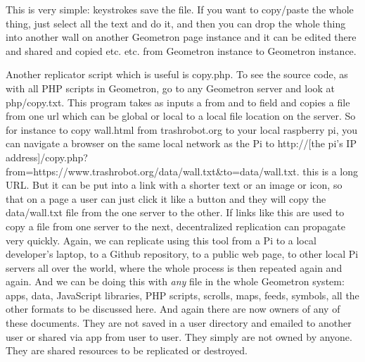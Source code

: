 This is very simple: keystrokes save the file. If you want to copy/paste the whole thing, just select all the text and do it, and then you can drop the whole thing into another wall on another Geometron page instance and it can be edited there and shared and copied etc. etc. from Geometron instance to Geometron instance.  

Another replicator script which is useful is copy.php.  To see the source code, as with all PHP scripts in Geometron, go to any Geometron server and look at php/copy.txt.  This program takes as inputs a from and to field and copies a file from one url which can be global or local to a local file location on the server.  So for instance to copy wall.html from trashrobot.org to your local raspberry pi, you can navigate a browser on the same local network as the Pi to http://[the pi's IP address]/copy.php?from=https://www.trashrobot.org/data/wall.txt&to=data/wall.txt.  this is a long URL.  But it can be put into a link with a shorter text or an image or icon, so that on a page a user can just click it like a button and they will copy the data/wall.txt file from the one server to the other.  If links like this are used to copy a file from one server to the next, decentralized replication can propagate very quickly.  Again, we can replicate using this tool from a Pi to a local developer's laptop, to a Github repository, to a public web page, to other local Pi servers all over the world, where the whole process is then repeated again and again.  And we can be doing this with \emph{any} file in the whole Geometron system: apps, data, JavaScript libraries, PHP scripts, scrolls, maps, feeds, symbols, all the other formats to be discussed here.  And again there are now owners of any of these documents.  They are not saved in a user directory and emailed to another user or shared via app from user to user.  They simply are not owned by anyone.  They are shared resources to be replicated or destroyed.  

